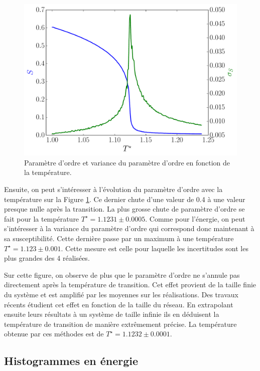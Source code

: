 \documentclass[11pt,a4paper]{article}
\numberwithin{equation}{section}
\begin{document}
\begin{figure}[h!]
    \centering	    
	\includegraphics[scale=0.6]{figures/local_order.pdf}
    \caption{Paramètre d'ordre et variance du paramètre d'ordre en fonction de la température.}
    	\label{local_order} 
\end{figure}

Ensuite, on peut s'intéresser à l'évolution du paramètre d'ordre avec la température sur la Figure \ref{local_order}. Ce dernier chute d'une valeur de 0.4 à une valeur presque nulle après la transition. La plus grosse chute de paramètre d'ordre se fait pour la température $T^\star = 1.1231 \pm 0.0005$. Comme pour l'énergie, on peut s'intéresser à la variance du paramètre d'ordre qui correspond donc maintenant à sa susceptibilité. Cette dernière passe par un maximum à une température $T^\star = 1.123 \pm 0.001$. Cette mesure est celle pour laquelle les incertitudes sont les plus grandes des 4 réalisées.
\medskip

Sur cette figure, on observe de plus que le paramètre d'ordre ne s'annule pas directement après la température de transition. Cet effet provient de la taille finie du système et est amplifié par les moyennes sur les réalisations. Des travaux récents \cite{cluster,nonb} étudient cet effet en fonction de la taille du réseau. En extrapolant ensuite leurs résultats à un système de taille infinie ils en déduisent la température de transition de manière extrêmement précise. La température obtenue par ces méthodes est de $T^\star = 1.1232 \pm 0.0001$.

\newpage

\subsection{Histogrammes en énergie}
\end{document}
